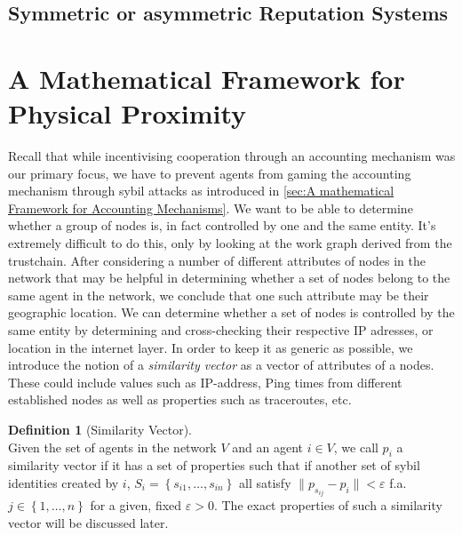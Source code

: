 \documentclass[11pt,a4paper]{report}
\theoremstyle{definition}
\newtheorem{definition}{Definition}[section]
\theoremstyle{theorem}
\theoremstyle{proposition}
\theoremstyle{corollary}
\theoremstyle{lemma}
\theoremstyle{example}
\theoremstyle{remark}
\begin{document}
\subsection{Symmetric or asymmetric Reputation Systems}
\label{subsec:Symmetric or asymmetric Reputation Systems}


\section{A Mathematical Framework for Physical Proximity}
\label{sec:A Mathematical Framework for Physical Proximity}
\noindent{}Recall that while incentivising cooperation through an accounting mechanism was our primary focus, we have to prevent agents from gaming the accounting mechanism through sybil attacks as introduced in \ref{sec:A mathematical Framework for Accounting Mechanisms}. We want to be able to determine whether a group of nodes is, in fact controlled by one and the same entity. It's extremely difficult to do this, only by looking at the work graph derived from the trustchain. After considering a number of different attributes of nodes in the network that may be helpful in determining whether a set of nodes belong to the same agent in the network, we conclude that one such attribute may be their geographic location. We can determine whether a set of nodes is controlled by the same entity by determining and cross-checking their respective IP adresses, or location in the internet layer. In order to keep it as generic as possible, we introduce the notion of a {\it similarity vector} as a vector of attributes of a nodes. These could include values such as IP-address, Ping times from different established nodes as well as properties such as traceroutes, etc.  \vspace{1em}\\

\begin{definition}[Similarity Vector]\ \\
Given the set of agents in the network $V$ and an agent $i\in{}V$, we call $p_i$ a similarity vector if it has a set of properties such that if another set of sybil identities created by $i$, $S_i=\left\lbrace{}s_{i1},\ldots,s_{in}\right\rbrace$ all satisfy $\|p_{s_{ij}}-p_i\|<\varepsilon$ f.a. $j\in\left\lbrace{}1,\ldots,n\right\rbrace$ for a given, fixed $\varepsilon > 0$. The exact properties of such a similarity vector will be discussed later. %
\end{definition}
\end{document}

